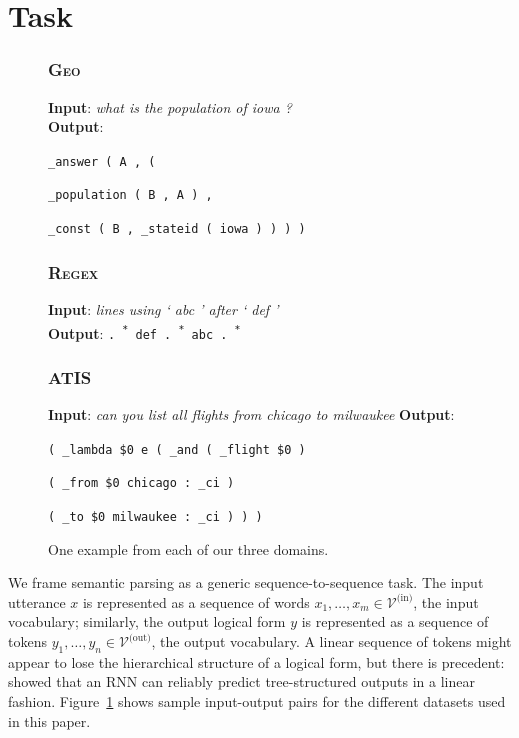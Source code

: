 \documentclass[11pt,letterpaper]{article}
\newcommand{\atis}{\textsc{ATIS}\xspace}
\newcommand{\regex}{\textsc{Regex}\xspace}
\newcommand{\geo}{\textsc{Geo}\xspace}
\newcommand{\vocabin}{\mathcal{V}^{\text{(in)}}}
\newcommand{\vocabout}{\mathcal{V}^{\text{(out)}}}
\newcommand\nl[1]{\textit{#1}}
\newcommand{\aster}{{\normalsize \textsuperscript{*}}\xspace}
\begin{document}
\section{Task}
\begin{figure}[t] 
\small
\begin{framed}
\footnotesize
\subsubsection*{\geo}
\textbf{Input}: \nl{what is the population of iowa ?}\\
\textbf{Output}:

\quad \texttt{\_answer ( A , ( }

\qquad \texttt{\_population ( B , A ) ,}

\qquad \texttt{\_const ( B , \_stateid ( iowa ) ) ) )}

\subsubsection*{\regex}
\textbf{Input}: \nl{lines using ` abc ' after ` def '}\\
\textbf{Output}: \texttt{. \aster def . \aster abc . \aster}

\subsubsection*{\atis}
\textbf{Input}: \nl{can you list all flights from chicago to milwaukee}
\textbf{Output}:

\quad \texttt{( \_lambda \$0 e ( \_and ( \_flight \$0 )}

\qquad \texttt{( \_from \$0 chicago : \_ci )}

\qquad \texttt{( \_to \$0 milwaukee : \_ci ) ) )}
\end{framed}
\caption{One example from each of our three domains.}
\label{fig:task}
\end{figure}

We frame semantic parsing as a generic sequence-to-sequence task.
The input utterance $x$ is represented as a sequence of words $x_1, \dotsc, x_m
\in \vocabin$, the input vocabulary;
similarly, the output logical form $y$ is represented
as a sequence of tokens $y_1, \dotsc, y_n \in \vocabout$, the output vocabulary.
A linear sequence of tokens might appear to lose the hierarchical structure of a logical form,
but there is precedent: 
showed that an RNN can reliably predict tree-structured outputs
in a linear fashion.
Figure~\ref{fig:task} shows sample input-output pairs for the different
datasets used in this paper.
\end{document}
